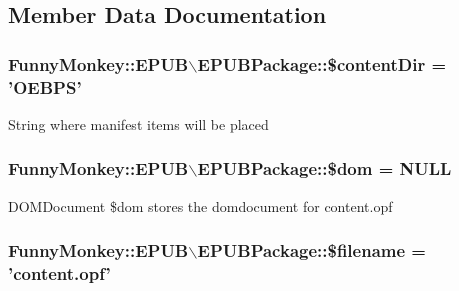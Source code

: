 \subsection{\-Member \-Data \-Documentation}
\hypertarget{classFunnyMonkey_1_1EPUB_1_1EPUBPackage_a72e9188b12cd6c29d0b4a502856b7d3a}{
\subsubsection[{\$content\-Dir}]{\setlength{\rightskip}{0pt plus 5cm}\-Funny\-Monkey\-::\-E\-P\-U\-B$\backslash$\-E\-P\-U\-B\-Package\-::\$content\-Dir = '\-O\-E\-B\-P\-S'}}\label{classFunnyMonkey_1_1EPUB_1_1EPUBPackage_a72e9188b12cd6c29d0b4a502856b7d3a}
\-String where manifest items will be placed \hypertarget{classFunnyMonkey_1_1EPUB_1_1EPUBPackage_ae9e0d92e7a247f32310e19539203f0bd}{
\subsubsection[{\$dom}]{\setlength{\rightskip}{0pt plus 5cm}\-Funny\-Monkey\-::\-E\-P\-U\-B$\backslash$\-E\-P\-U\-B\-Package\-::\$dom = \-N\-U\-L\-L}}\label{classFunnyMonkey_1_1EPUB_1_1EPUBPackage_ae9e0d92e7a247f32310e19539203f0bd}
\-D\-O\-M\-Document \$dom stores the domdocument for content.\-opf \hypertarget{classFunnyMonkey_1_1EPUB_1_1EPUBPackage_a4bab44c0c2b43c7b7dd9315f024a6ce8}{
\subsubsection[{\$filename}]{\setlength{\rightskip}{0pt plus 5cm}\-Funny\-Monkey\-::\-E\-P\-U\-B$\backslash$\-E\-P\-U\-B\-Package\-::\$filename = 'content.\-opf'}}\label{classFunnyMonkey_1_1EPUB_1_1EPUBPackage_a4bab44c0c2b43c7b7dd9315f024a6ce8}
